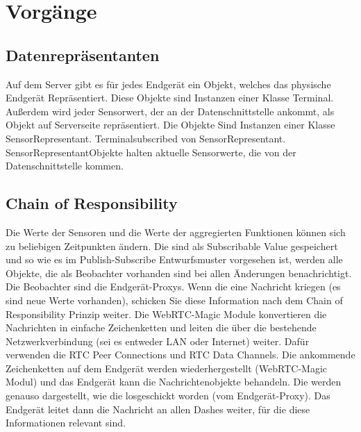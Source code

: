 \documentclass[pflichtenheft.tex]{subfiles}
\begin{document}
\chapter{Vorgänge}
\section{Datenrepräsentanten}

Auf dem Server gibt es für jedes Endgerät ein Objekt, welches das physische Endgerät Repräsentiert. Diese Objekte sind Instanzen einer Klasse \glq Terminal\grq. Außerdem wird jeder Sensorwert, der an der Datenschnittstelle ankommt, als Objekt auf Serverseite repräsentiert. Die Objekte Sind Instanzen einer Klasse \glq SensorRepresentant\grq. \glq Terminal\grq subscribed von \glq SensorRepresentant\grq. \glq SensorRepresentant\grq Objekte halten aktuelle Sensorwerte, die von der Datenschnittstelle kommen.

\section{Chain of Responsibility}

Die Werte der Sensoren und die Werte der aggregierten Funktionen können sich zu beliebigen Zeitpunkten ändern. Die sind als Subscribable Value gespeichert und so wie es im Publish-Subscribe Entwurfsmuster vorgesehen ist, werden alle Objekte, die als Beobachter vorhanden sind bei allen Änderungen benachrichtigt. Die Beobachter sind die Endgerät-Proxys. Wenn die eine Nachricht kriegen (es sind neue Werte vorhanden), schicken Sie diese Information nach dem Chain of Responsibility Prinzip weiter. Die WebRTC-Magic Module konvertieren die Nachrichten in einfache Zeichenketten und leiten die über die bestehende Netzwerkverbindung (sei es entweder LAN oder Internet) weiter. Dafür verwenden die RTC Peer Connections und RTC Data Channels. Die ankommende Zeichenketten auf dem Endgerät werden wiederhergestellt (WebRTC-Magic Modul) und das Endgerät kann die Nachrichtenobjekte behandeln. Die werden genauso dargestellt, wie die losgeschickt worden (vom Endgerät-Proxy). Das Endgerät leitet dann die Nachricht an allen Dashes weiter, für die diese Informationen relevant sind.
\end{document}
